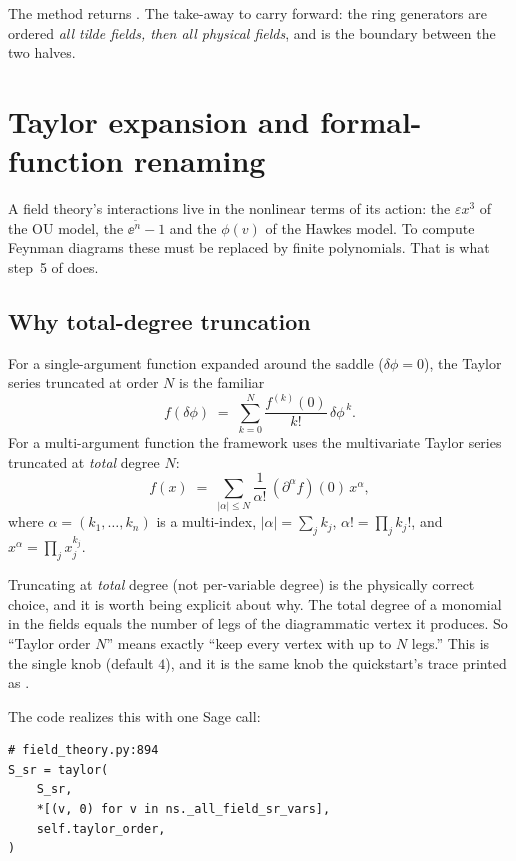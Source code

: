 The method returns . The take-away to carry forward: the
ring generators are ordered \emph{all tilde fields, then all physical fields}, and
 is the boundary between the two halves.

\section{Taylor expansion and formal-function renaming}\label{sec:taylor}

A field theory's interactions live in the nonlinear terms of its action: the
$\varepsilon x^3$ of the OU model, the $\ee^{\tilde n}-1$ and the $\phi(v)$ of the
Hawkes model. To compute Feynman diagrams these must be replaced by finite
polynomials. That is what step~5 of  does.

\subsection{Why total-degree truncation}

For a single-argument function expanded around the saddle ($\delta\phi=0$), the
Taylor series truncated at order $N$ is the familiar
\[
  f(\delta\phi) \;=\; \sum_{k=0}^{N} \frac{f^{(k)}(0)}{k!}\,\delta\phi^{\,k}.
\]
For a multi-argument function the framework uses the multivariate Taylor series
truncated at \emph{total} degree $N$:
\[
  f(x) \;=\; \sum_{|\alpha|\le N} \frac{1}{\alpha!}\,(\partial^{\alpha} f)(0)\,x^{\alpha},
\]
where $\alpha=(k_1,\dots,k_n)$ is a multi-index, $|\alpha|=\sum_j k_j$,
$\alpha!=\prod_j k_j!$, and $x^{\alpha}=\prod_j x_j^{k_j}$.

Truncating at \emph{total} degree (not per-variable degree) is the physically
correct choice, and it is worth being explicit about why. The total degree of a
monomial in the fields equals the number of legs of the diagrammatic vertex it
produces. So ``Taylor order $N$'' means exactly ``keep every vertex with up to $N$
legs.'' This is the single knob  (default $4$), and it is the
same knob the quickstart's \code{[1/7]} trace printed as .

The code realizes this with one Sage call:

\begin{lstlisting}
# field_theory.py:894
S_sr = taylor(
    S_sr,
    *[(v, 0) for v in ns._all_field_sr_vars],
    self.taylor_order,
)
\end{lstlisting}

